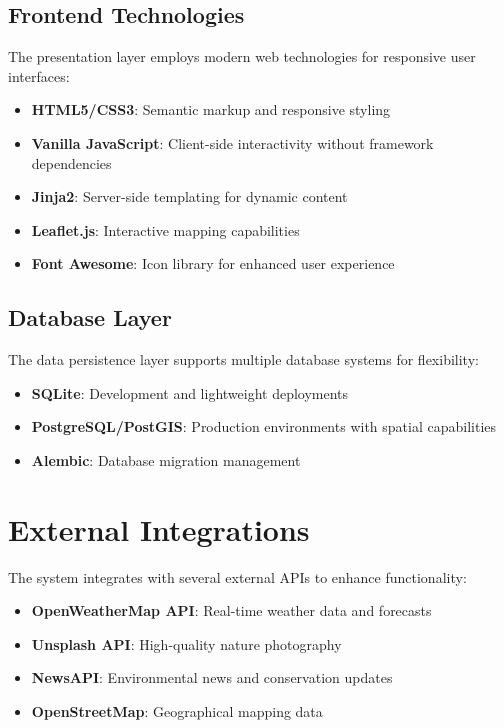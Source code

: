 \documentclass[12pt,a4paper]{report}
\begin{document}
\subsection{Frontend Technologies}

The presentation layer employs modern web technologies for responsive user interfaces:

\begin{itemize}
    \item \textbf{HTML5/CSS3}: Semantic markup and responsive styling
    \item \textbf{Vanilla JavaScript}: Client-side interactivity without framework dependencies
    \item \textbf{Jinja2}: Server-side templating for dynamic content
    \item \textbf{Leaflet.js}: Interactive mapping capabilities
    \item \textbf{Font Awesome}: Icon library for enhanced user experience
\end{itemize}

\subsection{Database Layer}

The data persistence layer supports multiple database systems for flexibility:

\begin{itemize}
    \item \textbf{SQLite}: Development and lightweight deployments
    \item \textbf{PostgreSQL/PostGIS}: Production environments with spatial capabilities
    \item \textbf{Alembic}: Database migration management
\end{itemize}

\section{External Integrations}

The system integrates with several external APIs to enhance functionality:

\begin{itemize}
    \item \textbf{OpenWeatherMap API}: Real-time weather data and forecasts
    \item \textbf{Unsplash API}: High-quality nature photography
    \item \textbf{NewsAPI}: Environmental news and conservation updates
    \item \textbf{OpenStreetMap}: Geographical mapping data
\end{itemize}
\end{document}
